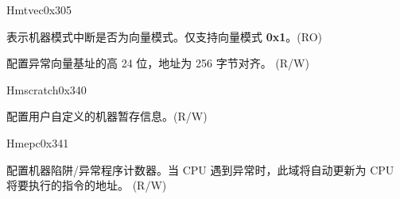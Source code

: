 \begin{register}{H}{mtvec}{0x305}\label{regdesc:MTVEC}
%
%
%
\regnewline%
\begin{regdesc}\begin{reglist}
\label{fielddesc:MTVECMODE}\item [MODE] 表示机器模式中断是否为向量模式。仅支持向量模式 \textbf{0x1}。(RO)
\label{fielddesc:MTVECBASE}\item [BASE] 配置异常向量基址的高 24 位，地址为 256 字节对齐。 (R/W)
\end{reglist}\end{regdesc}
\end{register}

\begin{register}{H}{mscratch}{0x340}\label{regdesc:MSCRATCH}
%
\regnewline%
\begin{regdesc}\begin{reglist}
\label{fielddesc:MSCRATCH}\item [MSCRATCH] 配置用户自定义的机器暂存信息。(R/W)
\end{reglist}\end{regdesc}
\end{register}

\begin{register}{H}{mepc}{0x341}\label{regdesc:MEPC}
%
\regnewline%
\begin{regdesc}\begin{reglist}
\label{fielddesc:MEPC}\item [MEPC] 配置机器陷阱/异常程序计数器。当 CPU 遇到异常时，此域将自动更新为 CPU 将要执行的指令的地址。 (R/W)
\end{reglist}\end{regdesc}
\end{register}

